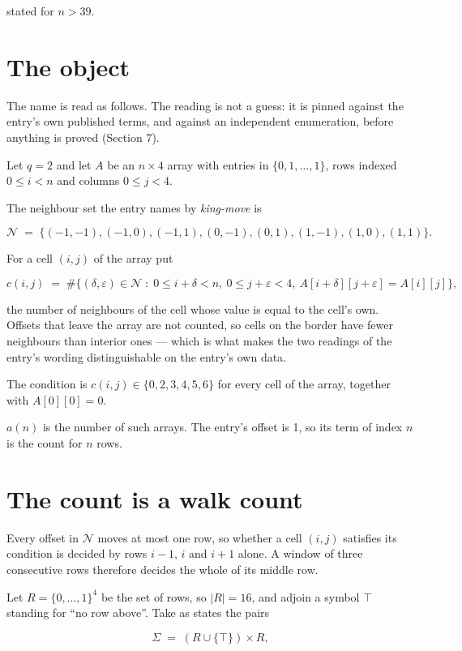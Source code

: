 \documentclass[11pt]{article}
\theoremstyle{definition}
\begin{document}
stated for $n > 39$.

\section{The object}

The name is read as follows. The reading is not a guess: it is pinned against the entry's own published terms, and against an independent enumeration, before anything is proved (Section 7).

Let $q = 2$ and let $A$ be an $n \times 4$ array with entries in $\{0,1,\dots,1\}$, rows indexed $0 \le i < n$ and columns $0 \le j < 4$.

The neighbour set the entry names by {\itshape king-move} is

\[\mathcal{N} \;=\; \{(-1,-1), (-1,0), (-1,1), (0,-1), (0,1), (1,-1), (1,0), (1,1)\}.\]

For a cell $(i,j)$ of the array put

\[c(i,j) \;=\; \#\bigl\{(\delta,\varepsilon)\in\mathcal{N} \;:\; 0\le i+\delta<n,\ 0\le j+\varepsilon<4,\ A[i+\delta][j+\varepsilon] = A[i][j]\bigr\},\]

the number of neighbours of the cell whose value is equal to the cell's own. Offsets that leave the array are not counted, so cells on the border have fewer neighbours than interior ones --- which is what makes the two readings of the entry's wording distinguishable on the entry's own data.

The condition is $c(i,j) \in \{0, 2, 3, 4, 5, 6\}$ for every cell of the array, together with $A[0][0]=0$.

$a(n)$ is the number of such arrays. The entry's offset is 1, so its term of index $n$ is the count for $n$ rows.

\section{The count is a walk count}

Every offset in $\mathcal{N}$ moves at most one row, so whether a cell $(i,j)$ satisfies its condition is decided by rows $i-1$, $i$ and $i+1$ alone. A window of three consecutive rows therefore decides the whole of its middle row.

Let $R = \{0,\dots,1\}^{4}$ be the set of rows, so $|R| = 16$, and adjoin a symbol $\top$ standing for ``no row above''. Take as states the pairs

\[\Sigma \;=\; (R \cup \{\top\}) \times R,\]
\end{document}
